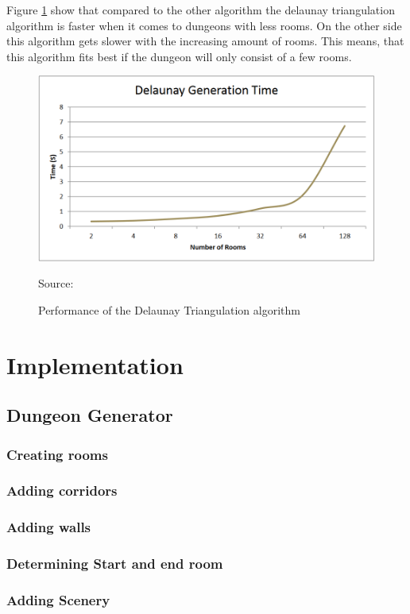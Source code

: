 \documentclass[a4paper,12pt,oneside]{scrreprt}
\begin{document}
Figure \ref{fig:delaunay_performance} show that compared to the other algorithm the delaunay triangulation algorithm is faster when it comes to dungeons with less rooms. On the other side this algorithm gets slower with the increasing amount of rooms. This means, that this algorithm fits best if the dungeon will only consist of a few rooms.
\begin{figure}[htb]
\centering
\includegraphics[scale=0.5]{images/delaunay_performance.png} 
\caption{Performance of the Delaunay Triangulation algorithm}
Source: \cite[][]{williams_investigation_nodate}
\label{fig:delaunay_performance}
\end{figure}

\chapter{Implementation}
\section{Dungeon Generator}
\subsection{Creating rooms}
\subsection{Adding corridors}
\subsection{Adding walls}
\subsection{Determining Start and end room}
\subsection{Adding Scenery}
\end{document}
